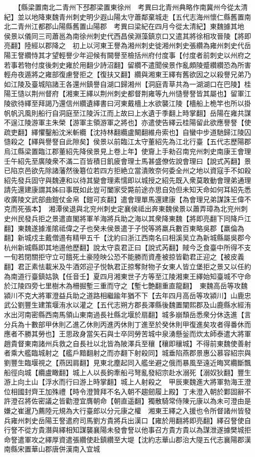 　　【縣梁置南北二青州下邳郡梁置東徐州　考異曰北青州典略作南冀州今從太清紀】並以地降東魏青州刺史明少遐山陽太守蕭鄰棄城走【五代志海州懷仁縣舊置南北二青州江都郡山陽縣舊置山陽郡　考異曰梁紀在四月今從太清紀】東魏據其地　侯景以儀同三司蕭邕為南徐州刺史代西昌侯淵藻鎮京口又遣其將徐相攻晉陵【將即亮翻】陸經以郡降之　初上以河東王譽為湘州刺史徙湘州刺史張纘為雍州刺史代岳陽王詧纘恃其才望輕譽少年迎候有闕譽至檢括州府付度事【付度者前刺史以州府之若事若物付度後刺史雍於用翻少詩沼翻】留纘不遣聞侯景作亂頗陵蹙纘纘恐為所害輕舟夜遁將之雍部復慮詧拒之【復扶又翻】纘與湘東王繹有舊欲因之以殺譽兄弟乃如江陵及臺城陷諸王各還州鎮譽自湖口歸湘州【洞庭青草共為一湖湖口在巴陵】桂陽王慥以荆州督府【湘東王繹以荆州刺史都督荆雍等九州慥譽詧皆其屬也】留軍江陵欲待繹至拜謁乃還信州纘遺繹書曰河東戴檣上水欲襲江陵【檣船上桅竿也所以掛帆帆汎風則船行自洞庭至江陵泝江而上故曰上水遺于季翻上時掌翻】岳陽在雍共謀不逞江陵游軍主朱榮【游軍主領游軍之將也】亦遣使告繹云桂陽留此欲應譽詧【使疏吏翻】繹懼鑿船沈米斬纜【沈持林翻纜盧闞翻維舟索也】自蠻中步道馳歸江陵囚慥殺之【繹與譽詧自此隙矣】侯景以前臨江太守董紹先為江北行臺【五代志歷陽郡烏江縣梁置臨江郡董紹先降侯景見上卷上年】使齎上手勑召南兖州刺史南康王會理壬午紹先至廣陵衆不滿二百皆積日飢疲會理士馬甚盛僚佐說會理曰【說式芮翻】景已陷京邑欲先除諸藩然後簒位若四方拒絶立當潰敗奈何委全州之地以資寇手不如殺紹先發兵固守與魏連和以待其變會理素懦即以城授之紹先既入衆莫敢動會理弟通理請先還建康謂其姊曰事既如此豈可闔家受斃前途亦思自効但未知天命如何耳紹先悉收廣陵文武部曲鎧仗金帛【鎧可亥翻】遣會理單馬還建康【為會理兄弟謀誅王偉不克而死張本】　湘潭侯退與北兖州刺史定襄侯祗出奔東魏侯景以蕭弄璋為北兖州刺史州民發兵拒之景遣直閣將軍羊海將兵助之海以其衆降東魏【將即亮翻下同降戶江翻】東魏遂據淮隂祗偉之子也癸未侯景遣于子悦等將羸兵數百東略吳郡【羸倫為翻】新城戍主戴僧逷有精甲五千【沈約曰浙江西南名曰相溪吴立為新城縣屬吳郡今杭州新城縣即其地逷他歷翻】說太守袁君正曰【說式芮翻】賊今乏食臺中所得不支一旬若閉關拒守立可餓死土豪陸映公恐不能勝而資產被掠皆勸君正迎之【被皮義翻】君正素怯載米及牛酒郊迎子悦執君正掠奪財物子女東人皆立堡拒之景又以任約為南道行臺鎮姑孰【任音壬】夏四月湘東世子方等至江陵湘東王繹始知臺城不守命於江陵四旁七里樹木為柵掘塹三重而守之【塹七艶翻重直龍翻】　東魏高岳等攻魏潁川不克大將軍澄益兵助之道路相繼踰年猶不下【去年四月高岳等攻潁川】山鹿忠武公劉豐生建策堰洧水以灌之【五代志朔方郡長澤縣後魏置闡熙郡及山鹿縣水經洧水出河南密縣西南馬領山東南過長社縣北堰於扇翻】城多崩頹岳悉衆分休迭進【言分兵為十數部甲休則乙進乙休則丙進丙休則丁進至於癸休則甲復進矣攻者得番休而應者不勝其勞也】王思政身當矢石與士卒同勞苦城中泉湧懸釡而炊太師泰遣大將軍趙貴督東南諸州兵救之自長社以北皆為陂澤兵至穰【穰即穰城】不得前東魏使善射者乘大艦臨城射之【艦戶黯翻射之而亦翻下射殺同】城垂陷燕郡景惠公慕容紹宗與劉豐生臨堰視之【燕因肩翻】見東北塵起同入艦坐避之俄而暴風至遠近晦冥纜斷飄船徑向城【纜盧瞰翻】城上人以長鉤牽船弓弩亂發紹宗赴水溺死【溺奴狄翻】豐生游上向土山【浮水而行曰游上時掌翻】城上人射殺之　甲辰東魏進大將軍勃海王澄位相國封齊王加殊禮【時令澄贊拜不名入朝不趨劒履上殿】丁未澄入朝於鄴固辭不許澄召將佐密議之皆勸澄宜膺朝命【朝直遥翻】獨散騎常侍陳元康以為未可澄由是嫌之崔暹乃薦陸元規為大行臺郎以分元康之權　湘東王繹之入援也令所督諸州皆發兵雍州刺史岳陽王詧遣府司馬劉方貴將兵出漢口【雍於用翻將即亮翻】繹召詧使自行詧不從方貴潛與繹相知謀襲襄陽未發會詧以他事召方貴方貴以為謀泄遂據樊城拒命詧遣軍攻之繹厚資遣張纘使赴鎮纘至大堤【沈約志華山郡治大隄五代志襄陽郡漢南縣宋置華山郡唐併漢南入宜城